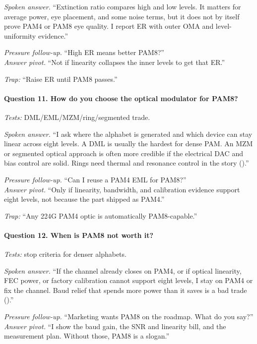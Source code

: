 \textit{Spoken answer.}
``Extinction ratio compares high and low levels. It matters for average power,
eye placement, and some noise terms, but it does not by itself prove PAM4 or
PAM8 eye quality. I report ER with outer OMA and level-uniformity evidence.''

\textit{Pressure follow-up.} ``High ER means better PAM8?''\\
\textit{Answer pivot.} ``Not if linearity collapses the inner levels to get that
ER.''

\textit{Trap:} ``Raise ER until PAM8 passes.''

\paragraph{Question 11. How do you choose the optical modulator for PAM8?}
\textit{Tests:} DML/EML/MZM/ring/segmented trade.

\textit{Spoken answer.}
``I ask where the alphabet is generated and which device can stay linear across
eight levels. A DML is usually the hardest for dense PAM. An MZM or segmented
optical approach is often more credible if the electrical DAC and bias control
are solid. Rings need thermal and resonance control in the story
().''

\textit{Pressure follow-up.} ``Can I reuse a PAM4 EML for PAM8?''\\
\textit{Answer pivot.} ``Only if linearity, bandwidth, and calibration evidence
support eight levels, not because the part shipped as PAM4.''

\textit{Trap:} ``Any 224G PAM4 optic is automatically PAM8-capable.''

\paragraph{Question 12. When is PAM8 not worth it?}
\textit{Tests:} stop criteria for denser alphabets.

\textit{Spoken answer.}
``If the channel already closes on PAM4, or if optical linearity, FEC power, or
factory calibration cannot support eight levels, I stay on PAM4 or fix the
channel. Baud relief that spends more power than it saves is a bad trade
().''

\textit{Pressure follow-up.} ``Marketing wants PAM8 on the roadmap. What do you
say?''\\
\textit{Answer pivot.} ``I show the baud gain, the SNR and linearity bill, and
the measurement plan. Without those, PAM8 is a slogan.''

